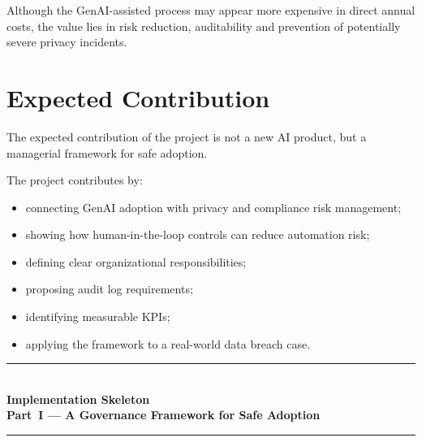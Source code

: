 \documentclass[12pt,a4paper]{article}
\begin{document}
\begin{principlebox}
Although the GenAI-assisted process may appear more expensive in direct annual costs, the value lies in risk reduction, auditability and prevention of potentially severe privacy incidents.
\end{principlebox}

\section{Expected Contribution}

The expected contribution of the project is not a new AI product, but a managerial framework for safe adoption.

The project contributes by:

\begin{itemize}
    \item connecting GenAI adoption with privacy and compliance risk management;
    \item showing how human-in-the-loop controls can reduce automation risk;
    \item defining clear organizational responsibilities;
    \item proposing audit log requirements;
    \item identifying measurable KPIs;
    \item applying the framework to a real-world data breach case.
\end{itemize}

\clearpage
\begin{center}
{\color{accentdark}\rule{\textwidth}{1.2pt}}\\[6pt]
{\Huge\bfseries\color{accentdark} Implementation Skeleton}\\[8pt]
{\LARGE\bfseries\color{accentdark!85!black} Part~I --- A Governance Framework for Safe Adoption}\\[8pt]
{\color{accentdark}\rule{\textwidth}{1.2pt}}
\end{center}
\vspace{8pt}
\end{document}
